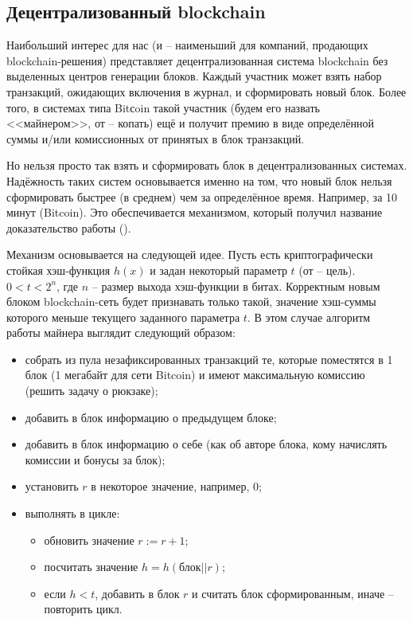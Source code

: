 \subsection{Децентрализованный blockchain}

Наибольший интерес для нас (и -- наименьший для компаний, продающих blockchain-решения) представляет децентрализованная система blockchain без выделенных центров генерации блоков. Каждый участник может взять набор транзакций, ожидающих включения в журнал, и сформировать новый блок. Более того, в системах типа Bitсoin такой участник (будем его назвать <<майнером>>, от  -- копать) ещё и получит премию в виде определённой суммы и/или комиссионных от принятых в блок транзакций.

Но нельзя просто так взять и сформировать блок в децентрализованных системах. Надёжность таких систем основывается именно на том, что новый блок нельзя сформировать быстрее (в среднем) чем за определённое время. Например, за 10 минут (Bitcoin). Это обеспечивается механизмом, который получил название доказательство работы ().

Механизм основывается на следующей идее. Пусть есть криптографически стойкая хэш-функция $h(x)$ и задан некоторый параметр $t$ (от  -- цель). $0 < t < 2^{n}$, где $n$ -- размер выхода хэш-функции в битах. Корректным новым блоком blockchain-сеть будет признавать только такой, значение хэш-суммы которого меньше текущего заданного параметра $t$. В этом случае алгоритм работы майнера выглядит следующий образом:
\begin{itemize}
	\item собрать из пула незафиксированных транзакций те, которые поместятся в 1 блок (1 мегабайт для сети Bitcoin) и имеют максимальную комиссию (решить задачу о рюкзаке);
	\item добавить в блок информацию о предыдущем блоке;
	\item добавить в блок информацию о себе (как об авторе блока, кому начислять комиссии и бонусы за блок);
	\item установить $r$ в некоторое значение, например, $0$;
	\item выполнять в цикле:
	\begin{itemize}
		\item обновить значение $r := r + 1$;
		\item посчитать значение $h = h( \text{блок} || r)$;
		\item если $h < t$, добавить в блок $r$ и считать блок сформированным, иначе -- повторить цикл.
	\end{itemize}
\end{itemize}

